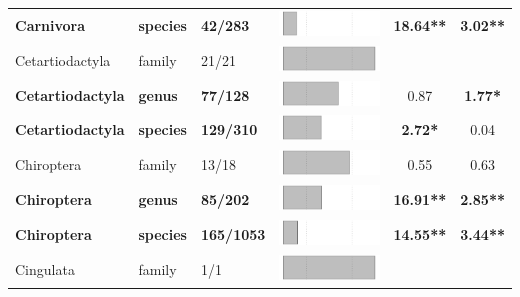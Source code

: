 \begin{longtable}{lL{1.8cm}C{2cm}ccc}
  \textbf{Carnivora} & \textbf{species} & \textbf{42/283} & \includegraphics[width=0.20\linewidth, height=0.05\linewidth]{Missing_mammals/Table_figures/bar6.pdf} & \textbf{18.64**} & \textbf{3.02**} \\ 
  Cetartiodactyla & family & 21/21 & \includegraphics[width=0.20\linewidth, height=0.05\linewidth]{Missing_mammals/Table_figures/bar7.pdf} &   &   \\ 
  \textbf{Cetartiodactyla} & \textbf{genus} & \textbf{77/128} & \includegraphics[width=0.20\linewidth, height=0.05\linewidth]{Missing_mammals/Table_figures/bar8.pdf} & 0.87 & \textbf{1.77*} \\ 
  \textbf{Cetartiodactyla} & \textbf{species} & \textbf{129/310} & \includegraphics[width=0.20\linewidth, height=0.05\linewidth]{Missing_mammals/Table_figures/bar9.pdf} & \textbf{2.72*} & 0.04 \\ 
  Chiroptera & family & 13/18 & \includegraphics[width=0.20\linewidth, height=0.05\linewidth]{Missing_mammals/Table_figures/bar10.pdf} & 0.55 & 0.63 \\ 
  \textbf{Chiroptera} & \textbf{genus} & \textbf{85/202} & \includegraphics[width=0.20\linewidth, height=0.05\linewidth]{Missing_mammals/Table_figures/bar11.pdf} & \textbf{16.91**} & \textbf{2.85**} \\ 
  \textbf{Chiroptera} & \textbf{species} & \textbf{165/1053} & \includegraphics[width=0.20\linewidth, height=0.05\linewidth]{Missing_mammals/Table_figures/bar12.pdf} & \textbf{14.55**} & \textbf{3.44**} \\ 
  Cingulata & family & 1/1 & \includegraphics[width=0.20\linewidth, height=0.05\linewidth]{Missing_mammals/Table_figures/bar13.pdf} &   &   \\ 

\end{longtable}
